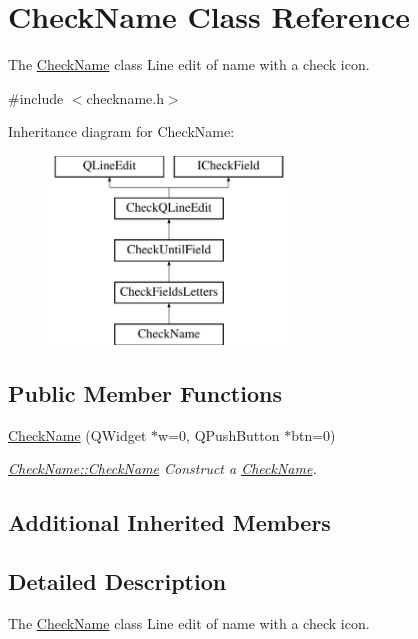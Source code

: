 \hypertarget{classCheckName}{\section{Check\-Name Class Reference}
\label{classCheckName}
}


The \hyperlink{classCheckName}{Check\-Name} class Line edit of name with a check icon.  




{\ttfamily \#include $<$checkname.\-h$>$}

Inheritance diagram for Check\-Name\-:\begin{figure}[H]
\begin{center}
\leavevmode
\includegraphics[height=5.000000cm]{dc/d14/classCheckName}
\end{center}
\end{figure}
\subsection*{Public Member Functions}
\begin{DoxyCompactItemize}
\item 
\hyperlink{classCheckName_a4a7fe601d6fd5e8576498e2d953df614}{Check\-Name} (Q\-Widget $\ast$w=0, Q\-Push\-Button $\ast$btn=0)
\begin{DoxyCompactList}\small\item\em \hyperlink{classCheckName_a4a7fe601d6fd5e8576498e2d953df614}{Check\-Name\-::\-Check\-Name} Construct a \hyperlink{classCheckName}{Check\-Name}. \end{DoxyCompactList}\end{DoxyCompactItemize}
\subsection*{Additional Inherited Members}


\subsection{Detailed Description}
The \hyperlink{classCheckName}{Check\-Name} class Line edit of name with a check icon. 

